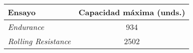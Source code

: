 \documentclass[varwidth=\maxdimen]{standalone}
\begin{document}
\begin{tabular}{ l c }
	\toprule
	Ensayo & Capacidad máxima (unds.) \\
	\midrule
	\textit{Endurance}	& 934 \\
	\textit{Rolling Resistance}		& 2502 \\
	\bottomrule
\end{tabular}
\end{document}
